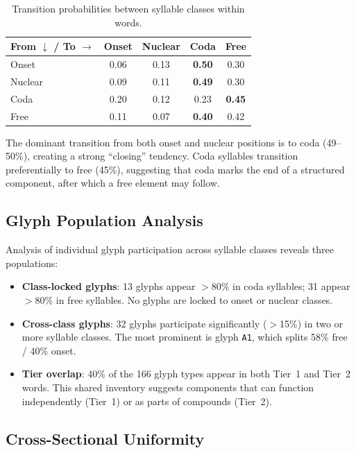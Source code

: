 \begin{table}[htbp]
\caption{Transition probabilities between syllable classes within words.}
\label{tab:transitions}
\centering
\begin{tabular}{lcccc}
\toprule
From $\downarrow$ / To $\rightarrow$ & Onset & Nuclear & Coda & Free \\
\midrule
Onset   & 0.06 & 0.13 & \textbf{0.50} & 0.30 \\
Nuclear & 0.09 & 0.11 & \textbf{0.49} & 0.30 \\
Coda    & 0.20 & 0.12 & 0.23 & \textbf{0.45} \\
Free    & 0.11 & 0.07 & \textbf{0.40} & 0.42 \\
\bottomrule
\end{tabular}
\end{table}

The dominant transition from both onset and nuclear positions is to coda (49--50\%), creating a strong ``closing'' tendency.  Coda syllables transition preferentially to free (45\%), suggesting that coda marks the end of a structured component, after which a free element may follow.

\subsection{Glyph Population Analysis}

Analysis of individual glyph participation across syllable classes reveals three populations:

\begin{itemize}[nosep]
  \item \textbf{Class-locked glyphs}: 13 glyphs appear $>$80\% in coda syllables; 31 appear $>$80\% in free syllables.  No glyphs are locked to onset or nuclear classes.
  \item \textbf{Cross-class glyphs}: 32 glyphs participate significantly ($>$15\%) in two or more syllable classes.  The most prominent is glyph \texttt{A1}, which splits 58\% free / 40\% onset.
  \item \textbf{Tier overlap}: 40\% of the 166 glyph types appear in both Tier~1 and Tier~2 words.  This shared inventory suggests components that can function independently (Tier~1) or as parts of compounds (Tier~2).
\end{itemize}

\subsection{Cross-Sectional Uniformity}

